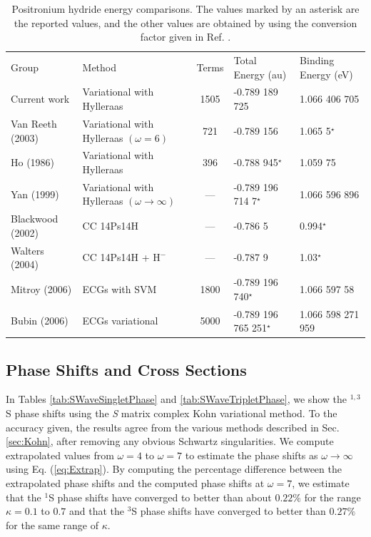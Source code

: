\documentclass[reprint,showpacs,preprintnumbers,amsmath,amssymb,pra,aps]{revtex4-1}
\begin{document}
\squeezetable  %
\begin{table}
\begin{center}
\begin{ruledtabular}  %
\begin{tabular}{l l c l l}
Group & Method & Terms & Total Energy (au) & Binding Energy (eV)\\
\colrule
Current work & Variational with Hylleraas & 1505 & -0.789 189 725 & 1.066 406 705 \\
Van Reeth (2003) \cite{VanReeth2003} & Variational with Hylleraas $(\omega = 6)$ & 721 & -0.789 156 & 1.065 5$^\star$ \\
Ho (1986) \cite{Ho1986} & Variational with Hylleraas & 396 & -0.788 945$^\star$ & 1.059 75 \\
Yan (1999) \cite{Yan1999} & Variational with Hylleraas $(\omega \rightarrow \infty)$ & --- & -0.789 196 714 7$^\star$ & 1.066 596 896 \\
Blackwood (2002) \cite{Blackwood2002} & CC 14Ps14H & --- & -0.786 5 & 0.994$^\star$ \\
Walters (2004) \cite{Walters2004} & CC 14Ps14H + $\text{H}^-$ & --- & -0.787 9 & 1.03$^\star$\\
Mitroy (2006) \cite{Mitroy2006} & ECGs with SVM & 1800 & -0.789 196 740$^\star$ & 1.066 597 58 \\
Bubin (2006) \cite{Bubin2006} & ECGs variational & 5000 & -0.789 196 765 251$^\star$ & 1.066 598 271 959 \\
\end{tabular}
\end{ruledtabular}
\caption{Positronium hydride energy comparisons. The values marked by an asterisk are the reported values, and the other values are obtained by using the conversion factor given in Ref. \cite{Mohr2012,*NISTConversions}.}
\label{tab:BoundEnergy}
\end{center}
\end{table}

\subsection{Phase Shifts and Cross Sections}

In Tables \ref{tab:SWaveSingletPhase} and \ref{tab:SWaveTripletPhase}, we show the $^{1,3}$S phase shifts using the \emph{S} matrix complex Kohn variational method. To the accuracy given, the results agree from the various methods described in Sec. \ref{sec:Kohn}, after removing any obvious Schwartz singularities. We compute extrapolated values from $\omega = 4$ to $\omega = 7$ to estimate the phase shifts as $\omega \rightarrow \infty$ using Eq. (\ref{eq:Extrap}). By computing the percentage difference between the extrapolated phase shifts and the computed phase shifts at $\omega=7$, we estimate that the $^1$S phase shifts have converged to better than about $0.22\%$ for the range $\kappa=0.1$ to $0.7$ and that the $^3$S phase shifts have converged to better than $0.27\%$ for the same range of $\kappa$.
\end{document}
